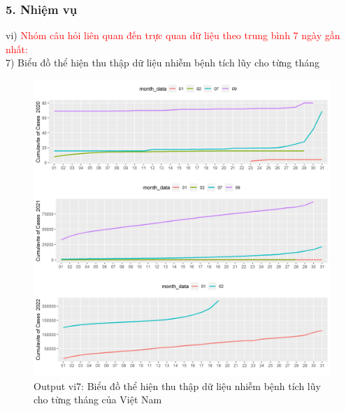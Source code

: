 \documentclass[english,10pt,table]{beamer}
\begin{document}
\begin{frame}[fragile]
\frametitle{5.  Nhiệm vụ}
vi) \textcolor{red}{Nhóm câu hỏi liên quan đến trực quan dữ liệu theo trung bình 7 ngày gần nhất:}\\
    7) Biểu đồ thể hiện thu thập dữ liệu nhiễm bệnh tích lũy cho từng tháng
	\begin{figure}[h!]
	\begin{center}
		    \includegraphics[scale = 0.26]{Images/VI/vi7 Vietnam .jpeg}
		     \caption{Output vi7: Biểu đồ thể hiện thu thập dữ liệu nhiễm bệnh tích lũy cho từng tháng của Việt Nam}
		\end{center}
		\end{figure}
\end{frame}
\end{document}
